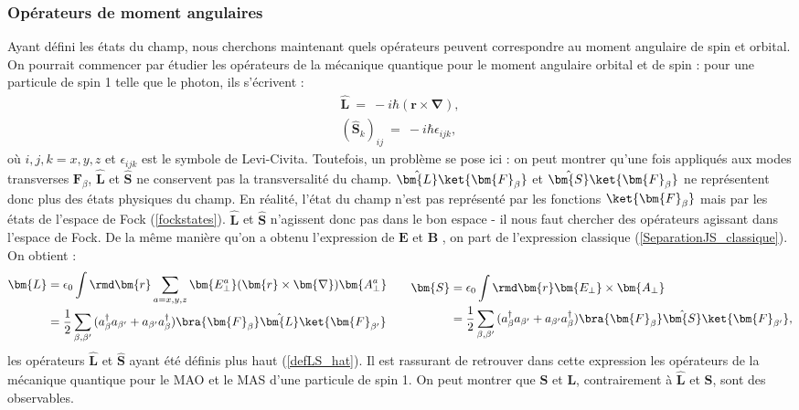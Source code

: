\subsubsection{Opérateurs de moment angulaires} 
Ayant défini les états du champ, nous cherchons maintenant quels opérateurs peuvent correspondre au moment angulaire de spin et orbital. On pourrait commencer par étudier les opérateurs de la mécanique quantique pour le moment angulaire orbital et de spin : pour une particule de spin 1 telle que le photon, ils s'écrivent :
\begin{equation}
\begin{aligned}
\hat{\bm{L}}~=~-i\hbar(\bm{r}\times\bm{\nabla}),\\
(\hat{\bm{S}}_k)_{ij}~=~-i\hbar\epsilon_{ijk},
\end{aligned} 
\label{defLS_hat}
\end{equation}
où $i,j,k=x,y,z$ et $\epsilon_{ijk}$ est le symbole de Levi-Civita.
Toutefois, un problème se pose ici : on peut montrer qu'une fois appliqués aux modes transverses $\bm{F}_\beta$, $\hat{\bm{L}}$ et $\hat{\bm{S}}$ ne conservent pas la transversalité du champ. $\hat{\bm{L}}\ket{\bm{F}_\beta}$ et $\hat{\bm{S}}\ket{\bm{F}_\beta}$ ne représentent donc plus des états physiques du champ. En réalité, l'état du champ n'est pas représenté par les fonctions $\ket{\bm{F}_\beta}$ mais par les états de l'espace de Fock (\ref{fockstates}). $\hat{\bm{L}}$ et $\hat{\bm{S}}$ n'agissent donc pas dans le bon espace - il nous faut chercher des opérateurs agissant dans l'espace de Fock. De la même manière qu'on a obtenu l'expression de $\bm{E}$ et $\bm{B}$ , on part de l'expression classique (\ref{SeparationJS_classique}). On obtient  :
\begin{equation}
\begin{aligned}[c]
\bm{L}&=\epsilon_0\int{\rmd\bm{r}\sum_{a=x,y,z} \bm{E^a_{\bot}}(\bm{r}\times\bm{\nabla})\bm{A^a_{\bot}}}\\
&=\frac{1}{2}\sum_{\beta,\beta'}{(a^{\dag}_{\beta}a_{\beta'}+a_{\beta'}a^{\dag}_{\beta})}\bra{\bm{F}_\beta}\hat{\bm{L}}\ket{\bm{F}_{\beta'}}
\end{aligned}
\qquad
\begin{aligned}[c]
\bm{S}&=\epsilon_0\int{\rmd\bm{r}\bm{E_{\bot}}\times\bm{A_{\bot}}}\\
&=\frac{1}{2}\sum_{\beta,\beta'}{(a^{\dag}_{\beta}a_{\beta'}+a_{\beta'}a^{\dag}_{\beta})}\bra{\bm{F}_\beta}\hat{\bm{S}}\ket{\bm{F}_{\beta'}},
\end{aligned}
\label{eqLS_QED}
\end{equation} 
les opérateurs $\hat{\bm{L}}$ et $\hat{\bm{S}}$ ayant été définis plus haut (\ref{defLS_hat}).
Il est rassurant de retrouver dans cette expression les opérateurs de la mécanique quantique pour le MAO et le MAS d'une particule de spin 1. On peut montrer que $\bm{S}$ et $\bm{L}$, contrairement à $\hat{\bm{L}}$ et $\hat{\bm{S}}$, sont des observables.

